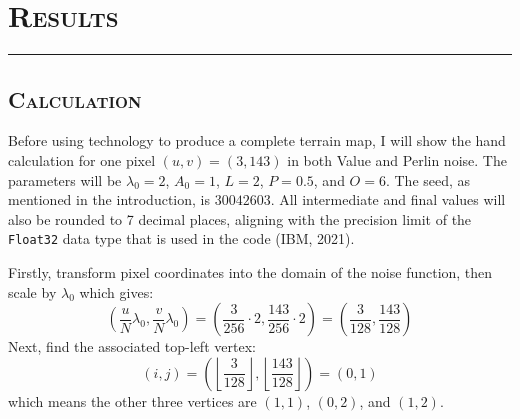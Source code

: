 \section{\textsc{Results}}
\hrule height 0.5pt
\vspace*{2.5pt}

\subsection{\textsc{Calculation}}
\vspace*{-10pt}

Before using technology to produce a complete terrain map, I will show the hand calculation for one pixel $(u,v)=(3,143)$ in both Value 
and Perlin noise. The parameters will be $\lambda_0=2$, $A_0=1$, $L=2$, $P=0.5$, and $O=6$. The seed, as mentioned in the introduction, 
is $30042603$. All intermediate and final values will also be rounded to 7 decimal places, aligning with the precision limit of the 
\texttt{Float32} data type that is used in the code (IBM, 2021).

Firstly, transform pixel coordinates into the domain of the noise function, then scale by $\lambda_0$ which gives:
\[\left(\frac{u}{N}\lambda_0,\frac{v}{N}\lambda_0\right)=\left(\frac{3}{256}\cdot2,\frac{143}{256}\cdot2\right)=\left(\frac{3}{128},\frac{143}{128}\right)\]
Next, find the associated top-left vertex:
\[(i,j)=\left(\left\lfloor\frac{3}{128}\right\rfloor,\left\lfloor\frac{143}{128}\right\rfloor\right)=(0,1)\]
which means the other three vertices are $(1,1)$, $(0,2)$, and $(1,2)$.

